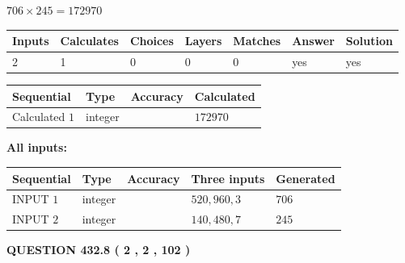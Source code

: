\documentclass{ctexart}
\begin{document}
 

$ %
706 \times  %
245=   %
172970$
 
 
\noindent{}
 
 

 
   
   
   
   
\noindent\begin{tabular}{|l|l|l|l|l|l|l|}
 \hline
Inputs & Calculates & Choices & Layers & Matches & Answer & Solution \\ \hline
 2  & 
 1  & 
 0
  & 
 0  & 
 0  & 
  yes & 
  yes 
  \\ \hline
 \end{tabular}
   
   
   
   
\noindent{}
   
   
  
  
\noindent\begin{tabular}{|l|l|l|l|}
\hline
 Sequential & Type & Accuracy & Calculated \\ 
\hline
 
 
  Calculated $  1 $ & integer &  & 
  $ 172970 $ 
 \\  \hline  
 \end{tabular}
   
   
   
   
\noindent\vspace{0.1in}\hspace{-0.08in} {\textbf{\Large{All inputs: }}}
   
   
  
  
\noindent\begin{tabular}{|l|l|l|l|l|}
\hline
 Sequential & Type & Accuracy & Three inputs & Generated \\ 
\hline
 
 
  INPUT $  1 $ & integer &  & $
 520
 , 
 960
 , 
 3
 $ & $ 706 $ 
 \\  \hline  
 
 
  INPUT $  2 $ & integer &  & $
 140
 , 
 480
 , 
 7
 $ & $ 245 $ 
 \\  \hline  
 \end{tabular}
   
   
  
\vspace{0.2in}
  
{\textbf{\Large{QUESTION
432.8 
 ( 2 , 2 , 102 )
}}}
  
\end{document}
